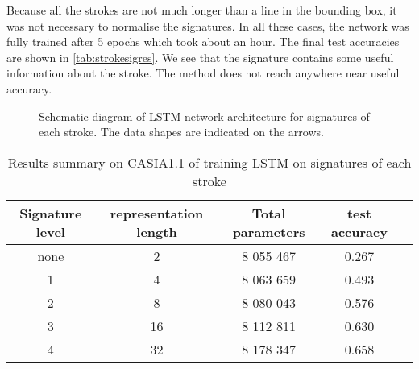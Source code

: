 Because all the strokes are not much longer than a line in the bounding box, it was not necessary to normalise the signatures. In all these cases, the network was fully trained after 5 epochs which took about an hour. The final test accuracies are shown in \autoref{tab:strokesigres}. We see that the signature contains some useful information about the stroke. The method does not reach anywhere near useful accuracy.

\begin{figure}
\centering
\caption[Signatures of each stroke LSTM network schematic.]{\label{fig:strokesig}Schematic diagram of  LSTM network architecture for signatures of each stroke. The data shapes are indicated on the arrows.}%
\end{figure}

\begin{table}
\centering
    \begin{tabular}{ccccc}
      \hline
      Signature level&representation length&Total parameters&test accuracy\\
      \hline
      none&2&8 055 467&0.267\\
      1&4&8 063 659&0.493\\
      2&8&8 080 043&0.576\\
      3&16&8 112 811&0.630\\
      4&32&8 178 347&0.658\\
      \hline
    \end{tabular}
  \caption[Results for signatures of each stroke]{Results summary on CASIA1.1 of training LSTM on signatures of each stroke}
  \label{tab:strokesigres}
\end{table}



